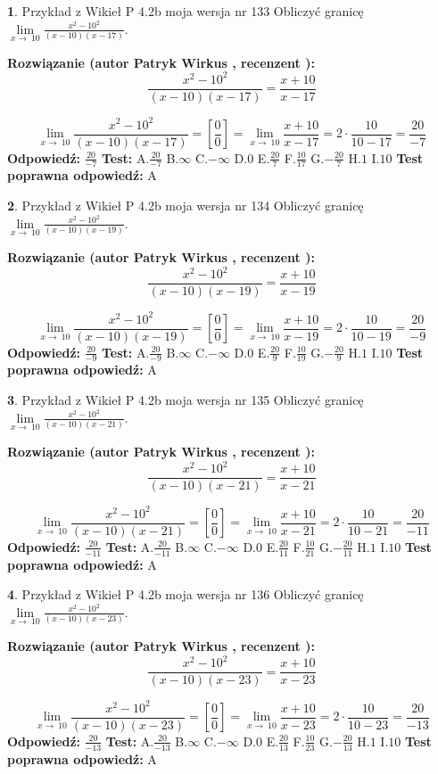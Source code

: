 \documentclass[12pt, a4paper]{article}
\theoremstyle{definition} %
\newtheorem{zad}{}
\newcommand{\zadStart}[1]{\begin{zad}#1\newline}
\newcommand{\zadStop}{\end{zad}}
\newcommand{\rozwStart}[2]{\noindent \textbf{Rozwiązanie (autor #1 , recenzent #2): }\newline}
\newcommand{\rozwStop}{\newline}
\newcommand{\odpStart}{\noindent \textbf{Odpowiedź:}\newline}
\newcommand{\odpStop}{\newline}
\newcommand{\testStart}{\noindent \textbf{Test:}\newline}
\newcommand{\testStop}{\newline}
\newcommand{\kluczStart}{\noindent \textbf{Test poprawna odpowiedź:}\newline}
\newcommand{\kluczStop}{\newline}
\begin{document}
\zadStart{Przykład z Wikieł P 4.2b moja wersja nr 133}
Obliczyć granicę $\lim\limits_{x\to\ 10}\frac{x^{2}-10^{2}}{(x-10)(x-17)}$.
\zadStop
\rozwStart{Patryk Wirkus}{}
$$\frac{x^{2}-10^{2}}{(x-10)(x-17)}=\frac{x+10}{x-17}$$

$$\lim\limits_{x\to\ 10}\frac{x^{2}-10^{2}}{(x-10)(x-17)}=[\frac{0}{0}]=\lim\limits_{x\to\ 10}\frac{x+10}{x-17}=2 \cdot \frac{10}{10-17} = \frac{20}{-7}$$
\rozwStop
\odpStart
$\frac{20}{-7}$
\odpStop
\testStart
A.$\frac{20}{-7}$
B.$\infty$
C.$-\infty$
D.$0$
E.$\frac{20}{7}$
F.$\frac{10}{17}$
G.$-\frac{20}{7}$
H.$1$
I.$10$
\testStop
\kluczStart
A
\kluczStop



\zadStart{Przykład z Wikieł P 4.2b moja wersja nr 134}
Obliczyć granicę $\lim\limits_{x\to\ 10}\frac{x^{2}-10^{2}}{(x-10)(x-19)}$.
\zadStop
\rozwStart{Patryk Wirkus}{}
$$\frac{x^{2}-10^{2}}{(x-10)(x-19)}=\frac{x+10}{x-19}$$

$$\lim\limits_{x\to\ 10}\frac{x^{2}-10^{2}}{(x-10)(x-19)}=[\frac{0}{0}]=\lim\limits_{x\to\ 10}\frac{x+10}{x-19}=2 \cdot \frac{10}{10-19} = \frac{20}{-9}$$
\rozwStop
\odpStart
$\frac{20}{-9}$
\odpStop
\testStart
A.$\frac{20}{-9}$
B.$\infty$
C.$-\infty$
D.$0$
E.$\frac{20}{9}$
F.$\frac{10}{19}$
G.$-\frac{20}{9}$
H.$1$
I.$10$
\testStop
\kluczStart
A
\kluczStop



\zadStart{Przykład z Wikieł P 4.2b moja wersja nr 135}
Obliczyć granicę $\lim\limits_{x\to\ 10}\frac{x^{2}-10^{2}}{(x-10)(x-21)}$.
\zadStop
\rozwStart{Patryk Wirkus}{}
$$\frac{x^{2}-10^{2}}{(x-10)(x-21)}=\frac{x+10}{x-21}$$

$$\lim\limits_{x\to\ 10}\frac{x^{2}-10^{2}}{(x-10)(x-21)}=[\frac{0}{0}]=\lim\limits_{x\to\ 10}\frac{x+10}{x-21}=2 \cdot \frac{10}{10-21} = \frac{20}{-11}$$
\rozwStop
\odpStart
$\frac{20}{-11}$
\odpStop
\testStart
A.$\frac{20}{-11}$
B.$\infty$
C.$-\infty$
D.$0$
E.$\frac{20}{11}$
F.$\frac{10}{21}$
G.$-\frac{20}{11}$
H.$1$
I.$10$
\testStop
\kluczStart
A
\kluczStop



\zadStart{Przykład z Wikieł P 4.2b moja wersja nr 136}
Obliczyć granicę $\lim\limits_{x\to\ 10}\frac{x^{2}-10^{2}}{(x-10)(x-23)}$.
\zadStop
\rozwStart{Patryk Wirkus}{}
$$\frac{x^{2}-10^{2}}{(x-10)(x-23)}=\frac{x+10}{x-23}$$

$$\lim\limits_{x\to\ 10}\frac{x^{2}-10^{2}}{(x-10)(x-23)}=[\frac{0}{0}]=\lim\limits_{x\to\ 10}\frac{x+10}{x-23}=2 \cdot \frac{10}{10-23} = \frac{20}{-13}$$
\rozwStop
\odpStart
$\frac{20}{-13}$
\odpStop
\testStart
A.$\frac{20}{-13}$
B.$\infty$
C.$-\infty$
D.$0$
E.$\frac{20}{13}$
F.$\frac{10}{23}$
G.$-\frac{20}{13}$
H.$1$
I.$10$
\testStop
\kluczStart
A
\kluczStop
\end{document}
